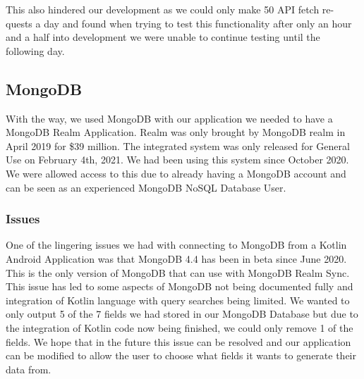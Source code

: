\newline
\newline
This also hindered our development as we could only make 50 API fetch re- quests a day and found when trying to test this functionality after only an hour and a half into development we were unable to continue testing until the following day.
\subsection{MongoDB}
With the way, we used MongoDB with our application we needed to have a MongoDB Realm Application. Realm was only brought by MongoDB realm in April 2019 for \$39 million. The integrated system was only released for General Use on February 4th, 2021. We had been using this system since October 2020. We were allowed access to this due to already having a MongoDB account and can be seen as an experienced MongoDB NoSQL Database User.
\subsubsection{Issues}
One of the lingering issues we had with connecting to MongoDB from a Kotlin Android Application was that MongoDB 4.4 has been in beta since June 2020. This is the only version of MongoDB that can use with MongoDB Realm Sync. This issue has led to some aspects of MongoDB not being documented fully and integration of Kotlin language with query searches being limited. We wanted to only output 5 of the 7 fields we had stored in our MongoDB Database but due to the integration of Kotlin code now being finished, we could only remove 1 of the fields. We hope that in the future this issue can be resolved and our application can be modified to allow the user to choose what fields it wants to generate their data from.
